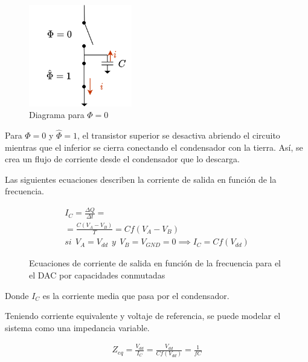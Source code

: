 \documentclass[12pt]{report} %
\begin{document}
	\begin{figure}[H]
		\includegraphics[width=0.4\textwidth]{sw-capacities-symbol-3.png}
		\caption[Diagrama para $\Phi=0$]{Diagrama para $\Phi=0$}
		\label{fig:sw-capacities-symbol-3.png}
	\end{figure}
	Para $\Phi = 0$ y $\hat{\Phi} = 1$, el transistor superior se desactiva abriendo el circuito mientras que el inferior se cierra conectando el condensador con la tierra. Así, se crea un flujo de corriente desde el condensador que lo descarga.
	
	Las siguientes ecuaciones describen la corriente de salida en función de la frecuencia.
	
	\begin{figure}[H]
		\caption{Ecuaciones de corriente de salida en función de la frecuencia para el el DAC por capacidades conmutadas}
		\label{sw-capacities-eqs}
		\begin{equation}
		\begin{array}{c}
		I_C = \frac{\Delta Q}{\Delta t} = \\
		= \frac{C(V_{A}-V_{B})}{T} = Cf(V_{A}-V_{B}) \\
		si\ \ V_{A} = V_{dd}\ \ y\ \ V_{B} = V_{GND} = 0 \implies I_C = Cf(V_{dd})
		\end{array}
		\end{equation}
	\end{figure}
	
	Donde $I_C$ es la corriente media que pasa por el condensador.
	
	Teniendo corriente equivalente y voltaje de referencia, se puede modelar el sistema como una impedancia variable.
	
	\begin{figure}[H]
		\label{sw-capacities-var-res}
		\begin{equation}
		\begin{array}{c}
		Z_{eq} = \frac{V_{dd}}{I_C} = \frac{V_{dd}}{Cf(V_{dd})} = \frac{1}{fC} \\
		\end{array}
		\end{equation}
	\end{figure}
	
\end{document}
